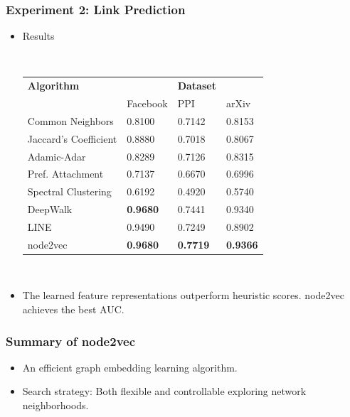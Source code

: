 \documentclass[notes, 10pt, aspectratio=169]{beamer}
\begin{document}
\begin{frame}
    \frametitle{Experiment 2: Link Prediction}
    \begin{itemize}
        \item Results\par
            ~\\
            \begin{tabular}{llll}
                \toprule
                \textbf{Algorithm} & & \textbf{Dataset} & \\
                             & Facebook & PPI & arXiv \\
                \midrule
                Common Neighbors & 0.8100 & 0.7142 & 0.8153\\
                Jaccard's Coefficient & 0.8880 & 0.7018 & 0.8067\\
                Adamic-Adar & 0.8289 & 0.7126 & 0.8315\\
                Pref. Attachment & 0.7137 & 0.6670 & 0.6996\\
                Spectral Clustering & 0.6192 & 0.4920 & 0.5740\\
                DeepWalk & \textbf{0.9680} & 0.7441 & 0.9340\\
                LINE & 0.9490 & 0.7249 & 0.8902\\
                node2vec & \textbf{0.9680} & \textbf{0.7719} & \textbf{0.9366}\\
                \bottomrule
            \end{tabular}
            \par~\\
        \item The learned feature representations outperform heuristic scores. node2vec achieves the best AUC.
    \end{itemize}
\end{frame}

\begin{frame}
    \frametitle{Summary of node2vec}
    \begin{itemize}
        \item An efficient graph embedding learning algorithm.
        \item Search strategy: Both flexible and controllable exploring network neighborhoods.
    \end{itemize}
\end{frame}
\end{document}
